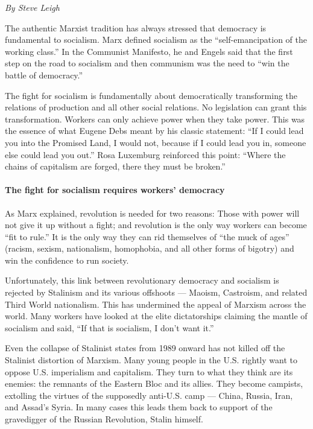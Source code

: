 \emph{By Steve Leigh}

The authentic Marxist tradition has always stressed that democracy is fundamental to socialism. Marx defined socialism as the “self-emancipation of the working class.” In the Communist Manifesto, he and Engels said that the first step on the road to socialism and then communism was the need to “win the battle of democracy.”

The fight for socialism is fundamentally about democratically transforming the relations of production and all other social relations. No legislation can grant this transformation. Workers can only achieve power when they take power. This was the essence of what Eugene Debs meant by his classic statement: “If I could lead you into the Promised Land, I would not, because if I could lead you in, someone else could lead you out.” Rosa Luxemburg reinforced this point: “Where the chains of capitalism are forged, there they must be broken.”

\paragraph{The fight for socialism requires workers' democracy}

As Marx explained, revolution is needed for two reasons: Those with power will not give it up without a fight; and revolution is the only way workers can become “fit to rule.” It is the only way they can rid themselves of “the muck of ages” (racism, sexism, nationalism, homophobia, and all other forms of bigotry) and win the confidence to run society.

Unfortunately, this link between revolutionary democracy and socialism is rejected by Stalinism and its various offshoots — Maoism, Castroism, and related Third World nationalism. This has undermined the appeal of Marxism across the world. Many workers have looked at the elite dictatorships claiming the mantle of socialism and said, “If that is socialism, I don’t want it.”

Even the collapse of Stalinist states from 1989 onward has not killed off the Stalinist distortion of Marxism. Many young people in the U.S. rightly want to oppose U.S. imperialism and capitalism. They turn to what they think are its enemies: the remnants of the Eastern Bloc and its allies. They become campists, extolling the virtues of the supposedly anti-U.S. camp — China, Russia, Iran, and Assad’s Syria. In many cases this leads them back to support of the gravedigger of the Russian Revolution, Stalin himself.

